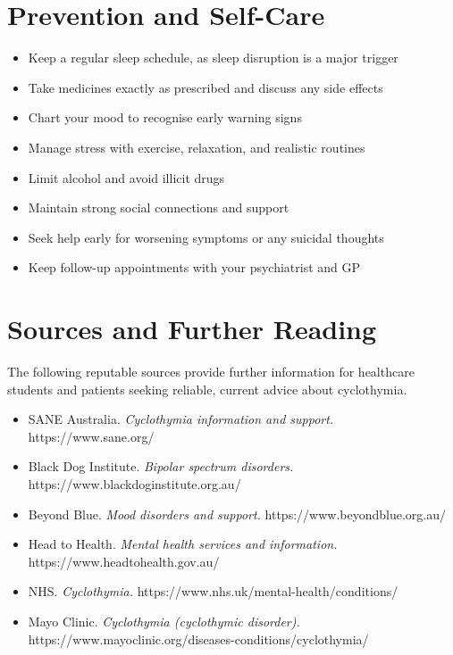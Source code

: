 \section*{Prevention and Self-Care}
\begin{itemize}
    \item Keep a regular sleep schedule, as sleep disruption is a major trigger
    \item Take medicines exactly as prescribed and discuss any side effects
    \item Chart your mood to recognise early warning signs
    \item Manage stress with exercise, relaxation, and realistic routines
    \item Limit alcohol and avoid illicit drugs
    \item Maintain strong social connections and support
    \item Seek help early for worsening symptoms or any suicidal thoughts
    \item Keep follow-up appointments with your psychiatrist and GP
\end{itemize}

\section*{Sources and Further Reading}
The following reputable sources provide further information for healthcare students and patients seeking reliable, current advice about cyclothymia.

\begin{itemize}
    \item SANE Australia. \textit{Cyclothymia information and support.} https://www.sane.org/
    \item Black Dog Institute. \textit{Bipolar spectrum disorders.} https://www.blackdoginstitute.org.au/
    \item Beyond Blue. \textit{Mood disorders and support.} https://www.beyondblue.org.au/
    \item Head to Health. \textit{Mental health services and information.} https://www.headtohealth.gov.au/
    \item NHS. \textit{Cyclothymia.} https://www.nhs.uk/mental-health/conditions/
    \item Mayo Clinic. \textit{Cyclothymia (cyclothymic disorder).} https://www.mayoclinic.org/diseases-conditions/cyclothymia/
\end{itemize}
